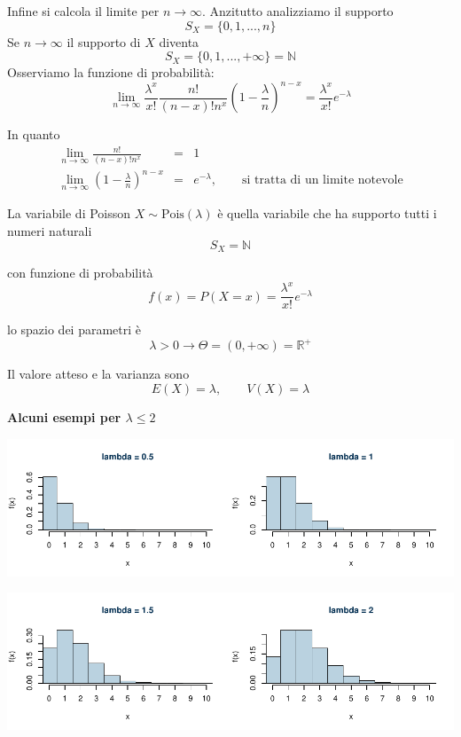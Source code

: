 \documentclass[
  11pt,
]{book}
\theoremstyle{mytheoremstyle}
\theoremstyle{mydefstyle}
\begin{document}
Infine si calcola il limite per \(n\to\infty\).
Anzitutto analizziamo il supporto
\[S_X=\{0,1,...,n\}\]
Se \(n\to\infty\) il supporto di \(X\) diventa
\[S_X=\{0,1,...,+\infty\}=\mathbb{N}\]
Osserviamo la funzione di probabilità:
\[\lim_{n\to\infty}\frac{\lambda^x}{x!}\frac{n!}{(n-x)! n^x}\left(1-\frac\lambda n\right)^{n-x} =\frac{\lambda^x}{x!}e^{-\lambda}\]

In quanto
\begin{eqnarray*}
  \lim_{n\to\infty}\frac{n!}{(n-x)! n^x} &=& 1\\
  \lim_{n\to\infty}\left(1-\frac\lambda n\right)^{n-x}    &=& e^{-\lambda},\qquad \text{si tratta di un limite notevole}
\end{eqnarray*}

La variabile di Poisson \(X\sim \text{Pois}(\lambda)\) è quella variabile che ha supporto tutti i numeri naturali
\[S_X=\mathbb{N}\]

con funzione di probabilità
\[f(x)=P(X=x)=\frac{\lambda^x}{x!}e^{-\lambda}\]

lo spazio dei parametri è
\[\lambda>0 \rightarrow \Theta=(0,+\infty)=\mathbb{R}^+\]

Il valore atteso e la varianza sono
\[E(X)=\lambda,\qquad V(X)=\lambda\]

\textbf{Alcuni esempi per \(\lambda\le 2\)}

\begin{center}\includegraphics{Appunti_di_Statistica_2025_files/figure-latex/07b-Poisson-1,-1} \end{center}

\begin{center}\includegraphics{Appunti_di_Statistica_2025_files/figure-latex/07b-Poisson-2,-1} \end{center}
\end{document}
